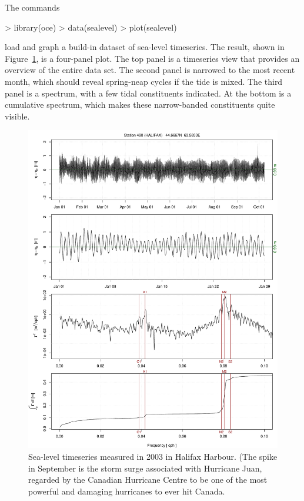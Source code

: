 \documentclass{article}
\begin{document}
The commands
\begin{Schunk}
\begin{Sinput}
> library(oce)
> data(sealevel)
> plot(sealevel)
\end{Sinput}
\end{Schunk}
load and graph a build-in dataset of sea-level timeseries. The result, shown in
Figure~\ref{fig:sealevel}, is a four-panel plot. The top panel is a timeseries view that
provides an overview of the entire data set. The second panel is narrowed to the most recent
month, which should reveal spring-neap cycles if the tide is mixed. The third panel is a
spectrum, with a few tidal constituents indicated. At the bottom is a cumulative spectrum,
which makes these narrow-banded constituents quite visible.

\begin{figure}
\begin{center}
\includegraphics{oce-sealevelfig}
\end{center}
\caption{Sea-level timeseries measured in 2003 in Halifax Harbour.
(The spike in September is the storm
surge associated with Hurricane Juan,
regarded by the Canadian Hurricane Centre to be 
one of the most powerful and damaging
hurricanes to ever hit Canada.}
\label{fig:sealevel}
\end{figure}
\end{document}
